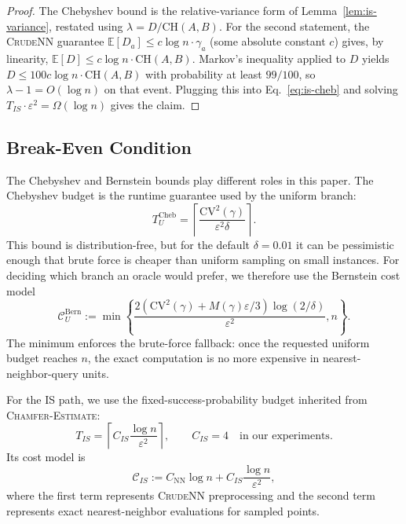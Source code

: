 \documentclass[conference]{IEEEtran}
\begin{document}
\begin{proof}
The Chebyshev bound is the relative-variance form of
Lemma~\ref{lem:is-variance}, restated using
$\lambda = D/\mathrm{CH}(A, B)$. For the second statement, the
\textsc{CrudeNN} guarantee
$\mathbb{E}[D_a] \leq c \log n \cdot \gamma_a$ (some absolute
constant $c$) gives, by linearity,
$\mathbb{E}[D] \leq c \log n \cdot \mathrm{CH}(A, B)$. Markov's
inequality applied to $D$ yields $D \leq 100 c \log n \cdot \mathrm{CH}(A, B)$
with probability at least $99/100$, so $\lambda - 1 = O(\log n)$ on
that event. Plugging this into Eq.~\ref{eq:is-cheb} and solving
$T_{IS} \cdot \varepsilon^2 = \Omega(\log n)$ gives the claim.
\end{proof}

\subsection{Break-Even Condition}
\label{sec:break-even}

The Chebyshev and Bernstein bounds play different roles in this paper.
The Chebyshev budget is the runtime guarantee used by the uniform branch:
\begin{equation}
    T_U^{\mathrm{Cheb}}
    =
    \left\lceil
        \frac{\mathrm{CV}^2(\gamma)}{\varepsilon^2\delta}
    \right\rceil .
\label{eq:cheb-runtime-budget}
\end{equation}
This bound is distribution-free, but for the default $\delta=0.01$ it
can be pessimistic enough that brute force is cheaper than uniform
sampling on small instances. For deciding which branch an oracle would
prefer, we therefore use the Bernstein cost model
\begin{equation}
    \mathcal{C}_U^{\mathrm{Bern}}
    :=
    \min\!\left\{
        \frac{
            2\left(\mathrm{CV}^2(\gamma)+M(\gamma)\varepsilon/3\right)
            \log(2/\delta)
        }{
            \varepsilon^2
        },
        n
    \right\}.
\label{eq:cost-unif-bern}
\end{equation}
The minimum enforces the brute-force fallback: once the requested
uniform budget reaches $n$, the exact computation is no more expensive
in nearest-neighbor-query units.

For the IS path, we use the fixed-success-probability budget inherited
from \textsc{Chamfer-Estimate}:
\begin{equation}
    T_{IS}
    =
    \left\lceil
        C_{IS}\frac{\log n}{\varepsilon^2}
    \right\rceil ,
    \qquad C_{IS}=4
    \quad\text{in our experiments}.
\label{eq:is-runtime-budget}
\end{equation}
Its cost model is
\begin{equation}
    \mathcal{C}_{IS}
    :=
    C_{\mathrm{NN}}\log n
    +
    C_{IS}\frac{\log n}{\varepsilon^2},
\label{eq:cost-is-oracle}
\end{equation}
where the first term represents \textsc{CrudeNN} preprocessing and the
second term represents exact nearest-neighbor evaluations for sampled
points.
\end{document}
